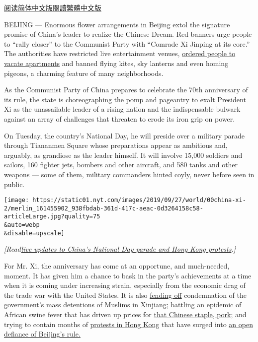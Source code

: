 \href{https://cn.nytimes.com/china/20190930/china-national-day-70th-anniversary/}{阅读简体中文版}\href{https://cn.nytimes.com/china/20190930/china-national-day-70th-anniversary/zh-hant/}{閱讀繁體中文版}

BEIJING --- Enormous flower arrangements in Beijing extol the signature
promise of China's leader to realize the Chinese Dream. Red banners urge
people to ``rally closer'' to the Communist Party with ``Comrade Xi
Jinping at its core.'' The authorities have restricted live
entertainment venues,
\href{https://www.nytimes.com/2019/09/23/world/asia/china-xi-jinping-communist-party-70th-anniversary.html}{ordered
people to vacate apartments} and banned flying kites, sky lanterns and
even homing pigeons, a charming feature of many neighborhoods.

As the Communist Party of China prepares to celebrate the 70th
anniversary of its rule,
\href{https://www.nytimes.com/2019/09/30/world/asia/china-national-day-hong-kong-protests.html}{the
state is choreographing} the pomp and pageantry to exalt President Xi as
the unassailable leader of a rising nation and the indispensable bulwark
against an array of challenges that threaten to erode its iron grip on
power.

On Tuesday, the country's National Day, he will preside over a military
parade through Tiananmen Square whose preparations appear as ambitious
and, arguably, as grandiose as the leader himself. It will involve
15,000 soldiers and sailors, 160 fighter jets, bombers and other
aircraft, and 580 tanks and other weapons --- some of them, military
commanders hinted coyly, never before seen in public.

\texttt{[image: https://static01.nyt.com/images/2019/09/27/world/00china-xi-2/merlin\_161455902\_938fbdab-361d-417c-aeac-0d3264158c58-articleLarge.jpg?quality=75\\\&auto=webp\\\&disable=upscale]}

\emph{{[}Read\href{https://www.nytimes.com/2019/09/30/world/asia/china-national-day-hong-kong-protests.html?module=inline}{live
updates to China's National Day parade and Hong Kong protests}.{]}}

For Mr. Xi, the anniversary has come at an opportune, and much-needed,
moment. It has given him a chance to bask in the party's achievements at
a time when it is coming under increasing strain, especially from the
economic drag of the trade war with the United States. It is also
\href{https://www.nytimes.com/2019/09/21/world/asia/china-islam-crackdown.html}{fending
off} condemnation of the government's mass detentions of Muslims in
Xinjiang; battling an epidemic of African swine fever that has driven up
prices for
\href{https://www.nytimes.com/2019/09/10/business/china-pork-prices.html}{that
Chinese staple, pork}; and trying to contain months of
\href{https://www.nytimes.com/2019/09/28/world/asia/hong-kong-protests-china.html}{protests
in Hong Kong} that have surged into
\href{https://www.nytimes.com/2019/09/27/world/asia/hong-kong-protests-identity.html}{an
open defiance of Beijing's rule.}

